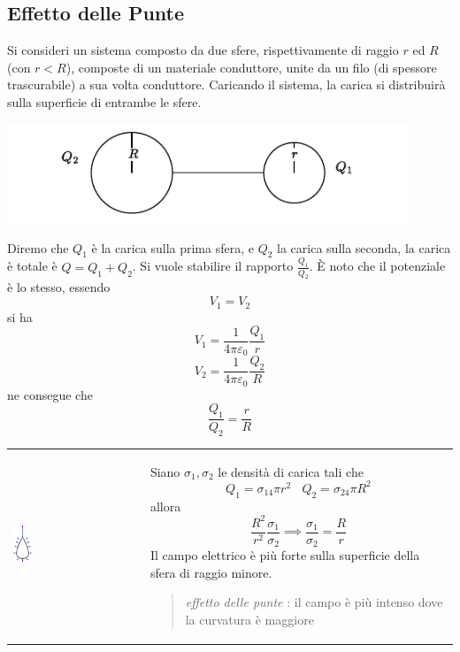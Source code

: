 \documentclass[10pt, letterpaper]{report}
\begin{document}
\subsection{Effetto delle Punte}
Si consideri un sistema composto da due sfere, rispettivamente di raggio $r$ ed $R$ (con $r<R$), composte di un materiale conduttore, unite da un filo (di spessore trascurabile) a sua volta conduttore. Caricando il sistema, la carica si distribuirà sulla superficie di entrambe le sfere.\begin{center}
    \includegraphics[width=0.9\textwidth]{images/punte.pdf}
\end{center} 
Diremo che $Q_1$ è la carica sulla prima sfera, e $Q_2$ la carica sulla seconda, la carica è totale è $Q=Q_1+Q_2$.
Si vuole stabilire il rapporto $\frac{Q_1}{Q_2}$. È noto che il potenziale è lo stesso, essendo 
$$ V_1=V_2$$
si ha 
$$ V_1=\frac{1}{4\pi\varepsilon_0}\frac{Q_1}{r}$$
$$ V_2=\frac{1}{4\pi\varepsilon_0}\frac{Q_2}{R}$$
ne consegue che 
$$ \frac{Q_1}{Q_2}=\frac{r}{R}$$
\begin{center}
	\begin{tabular}{>{\centering\arraybackslash}m{3in}>{\centering\arraybackslash}m{3in}}
        \includegraphics[width=0.15\textwidth]{images/effettoPunta.eps} &   
		Siano $\sigma_1,\sigma_2$ le densità di carica tali che 
$$ Q_1=\sigma_14\pi r^2 \ \ \ \ Q_2=\sigma_24\pi R^2$$
allora 
$$\frac{R^2}{r^2}\frac{\sigma_1}{\sigma_2}\implies \frac{\sigma_1}{\sigma_2}=\frac{R}{r} $$
Il campo elettrico è più forte sulla superficie della sfera di raggio minore.\begin{quote}
    \textit{effetto delle punte} : il campo è più intenso dove la curvatura è maggiore
\end{quote}
		\\
	\end{tabular}
\end{center}
\end{document}
